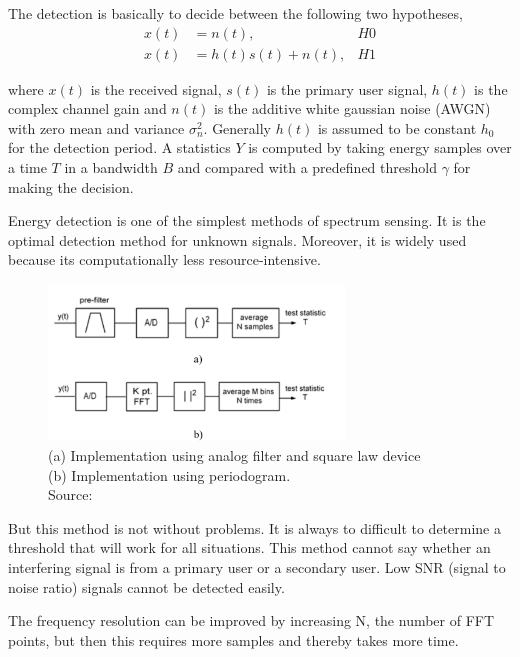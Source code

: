 The detection is basically to decide between the following two hypotheses,
\begin{align}
    x(t) &= n(t), & H0 \nonumber \\
    x(t) &= h(t)s(t) + n(t), & H1 \nonumber
\end{align}

where $x(t)$ is the received signal, $s(t)$ is the primary user signal, $h(t)$
is the complex channel gain and $n(t)$ is the additive white gaussian noise
(AWGN) with zero mean and variance $\sigma_n^2$. Generally $h(t)$ is assumed
to be constant $h_0$ for the detection period. A statistics $Y$ is computed by
taking energy samples over a time $T$ in a bandwidth $B$ and compared with a 
predefined threshold $\gamma$ for making the decision.

Energy detection is one of the simplest methods of spectrum sensing. It is the 
optimal detection method for unknown signals. Moreover, it is widely used 
because its computationally less resource-intensive.

\begin{figure}
    \centering
    \includegraphics[width=0.7\textwidth]{energyDetection}
    \caption[Energy Detection block diagram]{(a) Implementation using analog 
    filter and square law device \\
    (b) Implementation using periodogram. \\
    \footnotesize{Source: \cite{cabric06}}}
    \label{energyDetection}
\end{figure}

But this method is not without problems. It is always to difficult to 
determine a threshold that will work for all situations. This method cannot
say whether an interfering signal is from a primary user or a secondary user.
Low SNR (signal to noise ratio) signals cannot be detected easily.

The frequency resolution can be improved by increasing N, the number of FFT 
points, but then this requires more samples and thereby takes more time.

